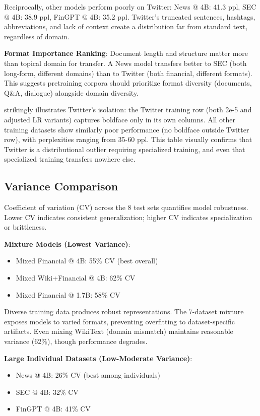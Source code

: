 Reciprocally, other models perform poorly on Twitter: News @ 4B: 41.3 ppl, SEC @ 4B: 38.9 ppl, FinGPT @ 4B: 35.2 ppl. Twitter's truncated sentences, hashtags, abbreviations, and lack of context create a distribution far from standard text, regardless of domain.

\textbf{Format Importance Ranking}: Document length and structure matter more than topical domain for transfer. A News model transfers better to SEC (both long-form, different domains) than to Twitter (both financial, different formats). This suggests pretraining corpora should prioritize format diversity (documents, Q\&A, dialogue) alongside domain diversity.



 strikingly illustrates Twitter's isolation: the Twitter training row (both 2e-5 and adjusted LR variants) captures boldface only in its own columns. All other training datasets show similarly poor performance (no boldface outside Twitter row), with perplexities ranging from 35-60 ppl. This table visually confirms that Twitter is a distributional outlier requiring specialized training, and even that specialized training transfers nowhere else.

\subsection{Variance Comparison}

Coefficient of variation (CV) across the 8 test sets quantifies model robustness. Lower CV indicates consistent generalization; higher CV indicates specialization or brittleness.

\textbf{Mixture Models (Lowest Variance)}:
\begin{itemize}
\item Mixed Financial @ 4B: 55\% CV (best overall)
\item Mixed Wiki+Financial @ 4B: 62\% CV
\item Mixed Financial @ 1.7B: 58\% CV
\end{itemize}

Diverse training data produces robust representations. The 7-dataset mixture exposes models to varied formats, preventing overfitting to dataset-specific artifacts. Even mixing WikiText (domain mismatch) maintains reasonable variance (62\%), though performance degrades.

\textbf{Large Individual Datasets (Low-Moderate Variance)}:
\begin{itemize}
\item News @ 4B: 26\% CV (best among individuals)
\item SEC @ 4B: 32\% CV
\item FinGPT @ 4B: 41\% CV
\end{itemize}

